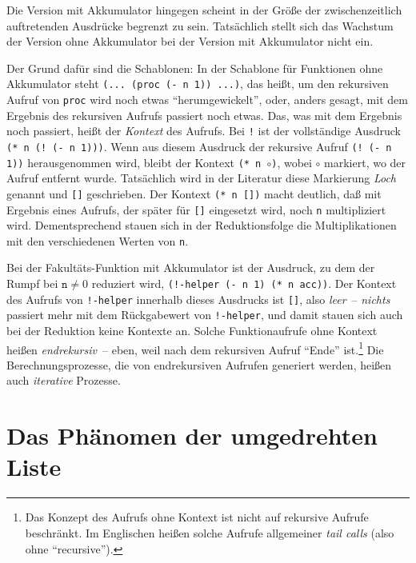 Die Version mit Akkumulator hingegen scheint in der Größe der
zwischenzeitlich auftretenden Ausdrücke begrenzt zu sein.  Tatsächlich
stellt sich das Wachstum der Version ohne Akkumulator bei der Version
mit Akkumulator nicht ein.

Der Grund dafür sind die Schablonen: In der Schablone für Funktionen
ohne Akkumulator steht \texttt{(... (proc (- n 1)) ...)}, das
heißt, um den rekursiven Aufruf von \texttt{proc} wird noch
etwas "`herumgewickelt"', oder, anders gesagt, mit dem Ergebnis des
rekursiven Aufrufs passiert noch etwas.  Das, was mit dem Ergebnis
noch passiert, heißt der \textit{Kontext} des Aufrufs.
Bei \texttt{!} ist der vollständige Ausdruck \texttt{(* n (! (- n
  1)))}.  Wenn aus diesem Ausdruck der rekursive Aufruf \texttt{(! (-
  n 1))} herausgenommen wird, bleibt der Kontext \texttt{(* n
  \(\circ\))}, wobei $\circ$ markiert, wo der Aufruf entfernt
wurde.  Tatsächlich wird in der Literatur diese Markierung
\textit{Loch} genannt und \texttt{[]} geschrieben.  Der
Kontext \texttt{(* n [])} macht deutlich, daß mit Ergebnis eines
Aufrufs, der später für \texttt{[]} eingesetzt wird, noch \texttt{n}
multipliziert wird.  Dementsprechend stauen sich in der
Reduktionsfolge die Multiplikationen mit den verschiedenen Werten von
\texttt{n}.

Bei der Fakultäts-Funktion mit Akkumulator ist der Ausdruck, zu dem
der Rumpf bei $\texttt{n} \neq 0$ reduziert wird, \texttt{(!-helper (- n 1)
  (* n acc))}.  Der Kontext des Aufrufs von \texttt{!-helper} innerhalb
dieses Ausdrucks ist \texttt{[]}, also \emph{leer}~-- \emph{nichts}
passiert mehr mit dem Rückgabewert von \texttt{!-helper}, und damit stauen
sich auch bei der Reduktion keine Kontexte an.  Solche Funktionaufrufe
ohne Kontext heißen \textit{endrekursiv}~-- eben,
weil nach dem rekursiven Aufruf "`Ende"' ist.\footnote{Das Konzept des
  Aufrufs ohne Kontext ist nicht auf rekursive Aufrufe beschränkt.  Im
  Englischen heißen solche Aufrufe allgemeiner \textit{tail
    calls} (also ohne "`recursive"').}
Die Berechnungsprozesse, die von endrekursiven Aufrufen generiert
werden, heißen auch \textit{iterative} Prozesse.

\section{Das Phänomen der umgedrehten Liste}

